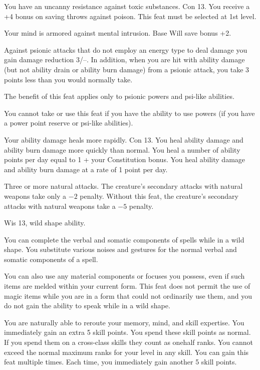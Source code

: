 {You have an uncanny resistance against toxic substances.}
{Con 13.}
{You receive a +4 bonus on saving throws against poison.}{}
{This feat must be selected at 1st level.}

{Your mind is armored against mental intrusion.}
{Base Will save bonus +2.}
{Against psionic attacks that do not employ an energy type to deal damage you gain damage reduction 3/--. In addition, when you are hit with ability damage (but not ability drain or ability burn damage) from a psionic attack, you take 3 points less than you would normally take.

The benefit of this feat applies only to psionic powers and psi-like abilities. %
}{}
{You cannot take or use this feat if you have the ability to use powers (if you have a power point reserve or psi-like abilities).}

{Your ability damage heals more rapidly.}
{Con 13.}
{You heal ability damage and ability burn damage more quickly than normal. You heal a number of ability points per day equal to 1 + your Constitution bonus.}
{You heal ability damage and ability burn damage at a rate of 1 point per day.}{}

{}
{Three or more natural attacks.}
{The creature's secondary attacks with natural weapons take only a $-2$ penalty.}
{Without this feat, the creature's secondary attacks with natural weapons take a $-5$ penalty.}
{}

{Wis 13, wild shape ability.}
{You can complete the verbal and somatic components of spells while in a wild shape. You substitute various noises and gestures for the normal verbal and somatic components of a spell.

You can also use any material components or focuses you possess, even if such items are melded within your current form. This feat does not permit the use of magic items while you are in a form that could not ordinarily use them, and you do not gain the ability to speak while in a wild shape.}

{You are naturally able to reroute your memory, mind, and skill expertise.}{}
{You immediately gain an extra 5 skill points. You spend these skill points as normal. If you spend them on a cross-class skills they count as onehalf ranks. You cannot exceed the normal maximum ranks for your level in any skill.}{}
{You can gain this feat multiple times. Each time, you immediately gain another 5 skill points.}

